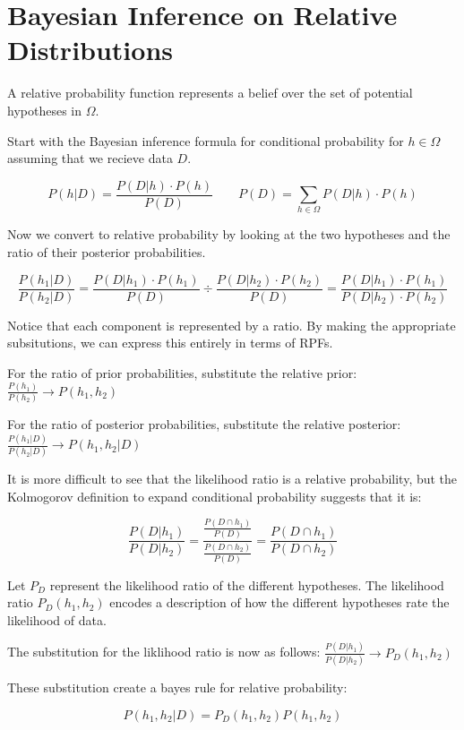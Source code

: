 \documentclass[twoside]{article}
\theoremstyle{plain}%
\theoremstyle{definition}
\theoremstyle{remark}
\begin{document}
\section{Bayesian Inference on Relative Distributions}

A relative probability function represents a belief over the set of potential hypotheses in \(\Omega\).

Start with the Bayesian inference formula for conditional probability for \(h \in \Omega\) assuming that we recieve data \(D\).

\[P(h|D) = \frac{P(D|h) \cdot P(h)}{P(D)} \qquad P(D) = \sum_{h \in \Omega} P(D|h) \cdot P(h)\]

Now we convert to relative probability by looking at the two hypotheses and the ratio of their posterior probabilities.

\[\frac{P(h_1|D)}{P(h_2| D)} = \frac{P(D|h_1) \cdot P(h_1)}{P(D)} \div \frac{P(D|h_2) \cdot P(h_2)}{P(D)} = \frac{P(D|h_1) \cdot P(h_1)}{P(D|h_2) \cdot P(h_2)} \]

Notice that each component is represented by a ratio. By making the appropriate subsitutions, we can express this entirely in terms of RPFs.

For the ratio of prior probabilities, substitute the relative prior: \(\frac{P(h_1)}{P(h_2)} \rightarrow P(h_1, h_2) \)

For the ratio of posterior probabilities, substitute the relative posterior: \(\frac{P(h_1|D)}{P(h_2|D)} \rightarrow P(h_1, h_2|D) \)

It is more difficult to see that the likelihood ratio is a relative probability, but the Kolmogorov definition to expand conditional probability suggests that it is:

\[\frac{P(D|h_1)}{P(D|h_2)} = \frac{\frac{P(D \cap h_1)}{P(D)}}{\frac{P(D \cap h_2)}{P(D)}} = \frac{P(D \cap h_1)}{P(D \cap h_2)} \]

Let \(P_D\) represent the likelihood ratio of the different hypotheses. The likelihood ratio \(P_D(h_1, h_2)\) encodes a description of how the different hypotheses rate the likelihood of data.

The substitution for the liklihood ratio is now as follows: \(\frac{P(D|h_1)}{P(D|h_2)} \rightarrow P_D(h_1, h_2) \)

These substitution create a bayes rule for relative probability:

\begin{equation}
P(h_1, h_2|D) = P_D(h_1, h_2) P(h_1, h_2)
\end{equation}
 
\end{document}
